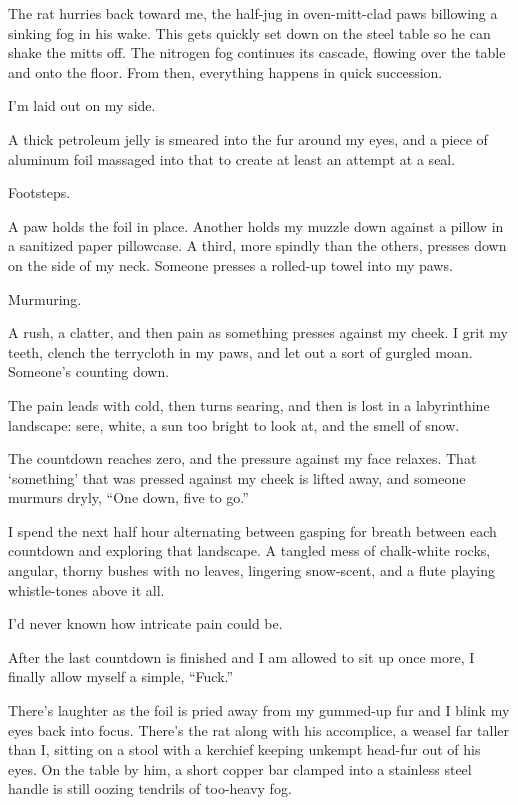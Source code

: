 The rat hurries back toward me, the half-jug in oven-mitt-clad paws billowing a sinking fog in his wake. This gets quickly set down on the steel table so he can shake the mitts off. The nitrogen fog continues its cascade, flowing over the table and onto the floor. From then, everything happens in quick succession.

I'm laid out on my side.

A thick petroleum jelly is smeared into the fur around my eyes, and a piece of aluminum foil massaged into that to create at least an attempt at a seal.

Footsteps.

A paw holds the foil in place. Another holds my muzzle down against a pillow in a sanitized paper pillowcase. A third, more spindly than the others, presses down on the side of my neck. Someone presses a rolled-up towel into my paws.

Murmuring.

A rush, a clatter, and then pain as something presses against my cheek. I grit my teeth, clench the terrycloth in my paws, and let out a sort of gurgled moan. Someone's counting down.

The pain leads with cold, then turns searing, and then is lost in a labyrinthine landscape: sere, white, a sun too bright to look at, and the smell of snow.

The countdown reaches zero, and the pressure against my face relaxes. That `something' that was pressed against my cheek is lifted away, and someone murmurs dryly, ``One down, five to go.''

I spend the next half hour alternating between gasping for breath between each countdown and exploring that landscape. A tangled mess of chalk-white rocks, angular, thorny bushes with no leaves, lingering snow-scent, and a flute playing whistle-tones above it all.

I'd never known how intricate pain could be.

After the last countdown is finished and I am allowed to sit up once more, I finally allow myself a simple, ``Fuck.''

There's laughter as the foil is pried away from my gummed-up fur and I blink my eyes back into focus. There's the rat along with his accomplice, a weasel far taller than I, sitting on a stool with a kerchief keeping unkempt head-fur out of his eyes. On the table by him, a short copper bar clamped into a stainless steel handle is still oozing tendrils of too-heavy fog.

